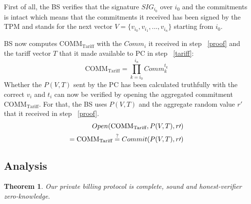 \documentclass[english]{llncs}
\newtheorem{thm}{Theorem}
\begin{document}
First of all, the BS verifies that the signature $SIG_{i_0}$ over $i_0$ and the commitments is intact which means that the commitments it received has been signed by the TPM and stands for the next vector $V=\{v_{i_0},v_{i_1},...,v_{i_n}\}$ starting from $i_0$.

BS now computes $\text{COMM}_{\text{Tariff}}$ with the $Comm_i$ it received in step ~\ref{proof} and the tariff vector $T$ that it made available to PC in step ~\ref{tariff}: 
\begin{equation*}
\text{COMM}_{\text{Tariff}}=\prod_{k=i_0}^{i_n} Comm_{k}^{t_k}
\end{equation*}
Whether the $P(V,T)$ sent by the PC has been calculated truthfully with the correct $v_i$ and $t_i$ can now be verified by opening the aggregated commitment $\text{COMM}_{\text{Tariff}}$. For that, the BS uses $P(V,T)$ and the aggregate random value $r'$ that it received in step ~\ref{proof}.
\begin{equation*}
\begin{split}
Open(\text{COMM}_{\text{Tariff}},P(V,T), r\prime)\\
= \text{COMM}_{\text{Tariff}} \stackrel{?}{=} Commit(P(V,T),r\prime) 
\end{split}
\end{equation*}

\subsection{Analysis}
\label{analysis}
\begin{thm}
Our private billing protocol is complete, sound and honest-verifier zero-knowledge.
\end{thm}
\end{document}
